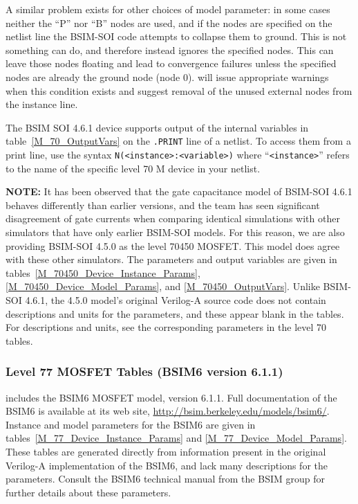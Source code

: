 A similar problem exists for other choices of model parameter: in some
cases neither the ``P'' nor ``B'' nodes are used, and if the nodes are
specified on the netlist line the BSIM-SOI code attempts to collapse
them to ground.  This is not something \Xyce{} can do, and therefore
instead \Xyce{} ignores the specified nodes.  This can leave those
nodes floating and lead to convergence failures unless the specified
nodes are already the ground node (node 0).  \Xyce{} will issue
appropriate warnings when this condition exists and suggest removal of
the unused external nodes from the instance line.

The BSIM SOI 4.6.1 device supports output of the internal variables in
table~\ref{M_70_OutputVars} on the \texttt{.PRINT} line of a netlist.
To access them from a print line, use the syntax
\texttt{N(<instance>:<variable>)} where ``\texttt{<instance>}'' refers to the
name of the specific level 70 M device in your netlist.

\textbf{NOTE:} It has been observed that the gate capacitance model of
BSIM-SOI 4.6.1 behaves differently than earlier versions, and the team
has seen significant disagreement of gate currents when comparing
identical simulations with other simulators that have only earlier
BSIM-SOI models.  For this reason, we are also providing BSIM-SOI
4.5.0 as the level 70450 MOSFET.  This model does agree with these
other simulators.  The parameters and output variables are given in
tables~\ref{M_70450_Device_Instance_Params},
\ref{M_70450_Device_Model_Params}, and \ref{M_70450_OutputVars}.
Unlike BSIM-SOI 4.6.1, the 4.5.0 model's original Verilog-A source
code does not contain descriptions and units for the parameters, and
these appear blank in the tables.  For descriptions and units, see the
corresponding parameters in the level 70 tables.








\clearpage
\subsubsection{Level 77 MOSFET Tables (BSIM6 version 6.1.1)}
\Xyce{} includes the BSIM6 MOSFET model, version 6.1.1.  Full
documentation of the BSIM6 is available at its web site,
\url{http://bsim.berkeley.edu/models/bsim6/}.  Instance and model
parameters for the BSIM6 are given in
tables~\ref{M_77_Device_Instance_Params} and
\ref{M_77_Device_Model_Params}.  These tables are generated directly
from information present in the original Verilog-A implementation of
the BSIM6, and lack many descriptions for the parameters.  Consult the
BSIM6 technical manual from the BSIM group for further details about
these parameters.

